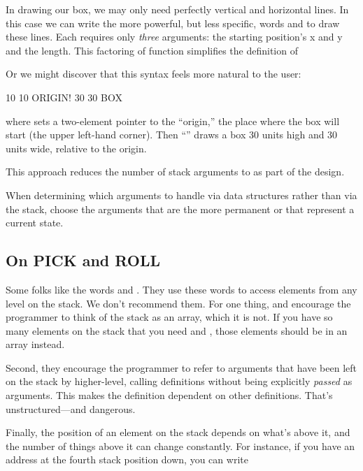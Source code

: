 In drawing our box, we may only need perfectly vertical and horizontal
lines. In this case we can write the more powerful, but less specific,
words  and  to draw these lines. Each requires
only \emph{three} arguments: the starting position's x and y and the
length. This factoring of function simplifies the definition of

Or we might discover that this syntax feels more natural to the
user:

\begin{Code}
10 10 ORIGIN! 30 30 BOX
\end{Code}
where  sets a two-element pointer to the ``origin,'' the place
where the box will start (the upper left-hand corner). Then ``''
draws a box 30 units high and 30 units wide, relative to the origin.

This approach reduces the number of stack arguments to  as
part of the design.

\begin{tip}
When determining which arguments to handle via data structures rather
than via the stack, choose the arguments that are the more permanent or
that represent a current state.
\end{tip}%
%
%

\subsection{On PICK and ROLL}%

Some folks like the words  and . They use these words to
access elements from any level on the stack. We don't recommend them.
For one thing,  and  encourage the programmer to think
of the stack as an array, which it is not. If you have so many elements on
the stack that you need  and , those elements should be in
an array instead.

Second, they encourage the programmer to refer to arguments that
have been left on the stack by higher-level, calling definitions without
being explicitly \emph{passed} as arguments. This makes the definition
dependent on other definitions. That's unstructured---and dangerous.

Finally, the position of an element on the stack depends on what's
above it, and the number of things above it can change constantly. For
instance, if you have an address at the fourth stack position down, you can
write

